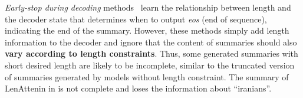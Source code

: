 {\em Early-stop during decoding} methods~\cite{KikuchiNSTO16,LiuLZ18,GOLC19,lenatten21} 
learn the relationship between length and the decoder state that determines when
to output {\em eos} (end of sequence), indicating the end of the summary.
However,
these methods simply add length information to the decoder
and ignore that the content of summaries 
should also {\bf vary according to length constraints}.
Thus, some generated summaries with short desired length are likely to be incomplete,
similar to the truncated version of summaries generated by models without length constraint.
The summary of LenAttenin in  is not complete and 
loses the information about ``iranians''.

